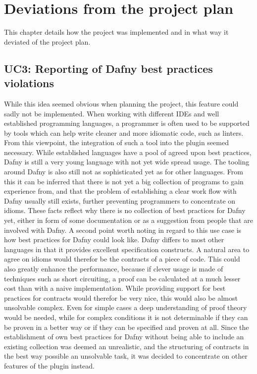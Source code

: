 \section{Deviations from the project plan}\label{projectCourse}
This chapter details how the project was implemented and in what way it deviated of the project plan.
\subsection{UC3: Reporting of Dafny best practices violations}
While this idea seemed obvious when planning the project, this feature could sadly not be implemented. When working with different IDEs and well established programming languages, a programmer is often used to be supported by tools which can help write cleaner and more idiomatic code, such as linters. From this viewpoint, the integration of such a tool into the plugin seemed necessary. \newline
While established languages have a pool of agreed upon best practices, Dafny is still a very young language with not yet wide spread usage. The tooling around Dafny is also still not as sophisticated yet as for other languages. From this it can be inferred that there is not yet a big collection of programs to gain experience from, and that the problem of establishing a clear work flow with Dafny usually still exists, further preventing programmers to concentrate on idioms. \newline
These facts reflect why there is no collection of best practices for Dafny yet, either in form of some documentation or as a suggestion from people that are involved with Dafny. \newline
A second point worth noting in regard to this use case is how best practices for Dafny could look like. Dafny differs to most other languages in that it provides excellent specification constructs. A natural area to agree on idioms would therefor be the contracts of a piece of code. This could also greatly enhance the performance, because if clever usage is made of techniques such as short circuiting, a proof can be calculated at a much lesser cost than with a naive implementation. \newline
While providing support for best practices for contracts would therefor be very nice, this would also be almost unsolvable complex. Even for simple cases a deep understanding of proof theory would be needed, while for complex conditions it is not determinable if they can be proven in a better way or if they can be specified and proven at all. \newline
Since the establishment of own best practices for Dafny without being able to include an existing collection was deemed an unrealistic, and the structuring of contracts in the best way possible an unsolvable task, it was decided to concentrate on other features of the plugin instead. \newline


